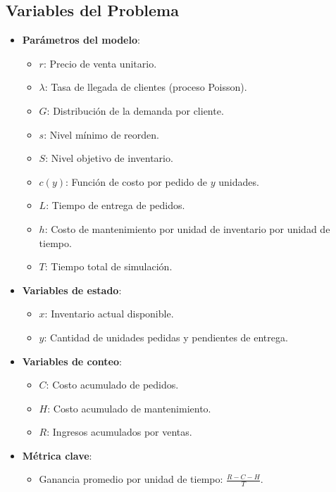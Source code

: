 \documentclass[a4paper,12pt]{article}
\begin{document}
\subsection*{Variables del Problema}
\begin{itemize}
    \item \textbf{Parámetros del modelo}:
    \begin{itemize}
        \item \( r \): Precio de venta unitario.
        \item \( \lambda \): Tasa de llegada de clientes (proceso Poisson).
        \item \( G \): Distribución de la demanda por cliente.
        \item \( s \): Nivel mínimo de reorden.
        \item \( S \): Nivel objetivo de inventario.
        \item \( c(y) \): Función de costo por pedido de \( y \) unidades.
        \item \( L \): Tiempo de entrega de pedidos.
        \item \( h \): Costo de mantenimiento por unidad de inventario por unidad de tiempo.
        \item \( T \): Tiempo total de simulación.
    \end{itemize}
    \item \textbf{Variables de estado}:
    \begin{itemize}
        \item \( x \): Inventario actual disponible.
        \item \( y \): Cantidad de unidades pedidas y pendientes de entrega.
    \end{itemize}
    \item \textbf{Variables de conteo}:
    \begin{itemize}
        \item \( C \): Costo acumulado de pedidos.
        \item \( H \): Costo acumulado de mantenimiento.
        \item \( R \): Ingresos acumulados por ventas.
    \end{itemize}
    \item \textbf{Métrica clave}:
    \begin{itemize}
        \item Ganancia promedio por unidad de tiempo: \( \frac{R - C - H}{T} \).
    \end{itemize}

\end{itemize}
\end{document}
